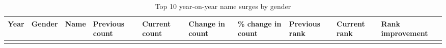\documentclass[11pt,preprint]{elsarticle}
\numberwithin{equation}{section}
\numberwithin{figure}{section}
\numberwithin{table}{section}
\begin{document}
\begin{longtable}[]{@{}
  >{\raggedright\arraybackslash}p{}
  >{\raggedright\arraybackslash}p{}
  >{\raggedright\arraybackslash}p{}
  >{\raggedright\arraybackslash}p{}
  >{\raggedright\arraybackslash}p{}
  >{\raggedright\arraybackslash}p{}
  >{\raggedright\arraybackslash}p{}
  >{\raggedright\arraybackslash}p{}
  >{\raggedright\arraybackslash}p{}
  >{\raggedright\arraybackslash}p{}@{}}
\caption{Top 10 year-on-year name surges by gender}\tabularnewline
\toprule\noalign{}
\begin{minipage}[b]{\linewidth}\raggedright
Year
\end{minipage} & \begin{minipage}[b]{\linewidth}\raggedright
Gender
\end{minipage} & \begin{minipage}[b]{\linewidth}\raggedright
Name
\end{minipage} & \begin{minipage}[b]{\linewidth}\raggedright
Previous count
\end{minipage} & \begin{minipage}[b]{\linewidth}\raggedright
Current count
\end{minipage} & \begin{minipage}[b]{\linewidth}\raggedright
Change in count
\end{minipage} & \begin{minipage}[b]{\linewidth}\raggedright
\% change in count
\end{minipage} & \begin{minipage}[b]{\linewidth}\raggedright
Previous rank
\end{minipage} & \begin{minipage}[b]{\linewidth}\raggedright
Current rank
\end{minipage} & \begin{minipage}[b]{\linewidth}\raggedright
Rank improvement
\end{minipage} \\
\midrule\noalign{}
\endfirsthead
\toprule\noalign{}
\begin{minipage}[b]{\linewidth}\raggedright

\end{minipage}
\end{longtable}
\end{document}
